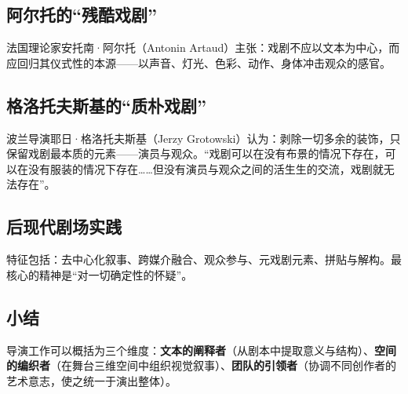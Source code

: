 \subsection{阿尔托的\enquote{残酷戏剧}}

法国理论家安托南·阿尔托（Antonin Artaud）主张：戏剧不应以文本为中心，而应回归其仪式性的本源——以声音、灯光、色彩、动作、身体冲击观众的感官。

\subsection{格洛托夫斯基的\enquote{质朴戏剧}}

波兰导演耶日·格洛托夫斯基（Jerzy Grotowski）认为：剥除一切多余的装饰，只保留戏剧最本质的元素——演员与观众。\enquote{戏剧可以在没有布景的情况下存在，可以在没有服装的情况下存在……但没有演员与观众之间的活生生的交流，戏剧就无法存在}\cite{grotowski:theatre}。

\subsection{后现代剧场实践}

特征包括：去中心化叙事、跨媒介融合、观众参与、元戏剧元素、拼贴与解构。最核心的精神是\enquote{对一切确定性的怀疑}。

\subsection*{小结}

导演工作可以概括为三个维度：\textbf{文本的阐释者}（从剧本中提取意义与结构）、\textbf{空间的编织者}（在舞台三维空间中组织视觉叙事）、\textbf{团队的引领者}（协调不同创作者的艺术意志，使之统一于演出整体）。
